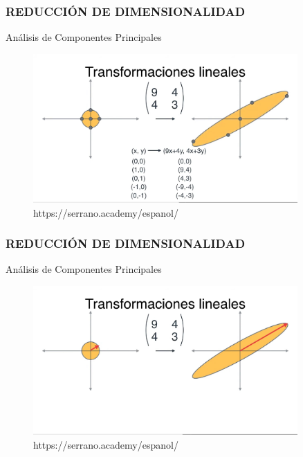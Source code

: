 \documentclass{beamer}
\begin{document}
\begin{frame}
\frametitle{REDUCCIÓN DE DIMENSIONALIDAD}
\begin{block}{Análisis de Componentes Principales}	
	\begin{figure}
		\includegraphics[width=0.9\textwidth]{PCA/IMG_3570.jpg}
		\caption{https://serrano.academy/espanol/}
	\end{figure}
\end{block}
\end{frame}


\begin{frame}
	\frametitle{REDUCCIÓN DE DIMENSIONALIDAD}
	\begin{block}{Análisis de Componentes Principales}	
		\begin{figure}
			\includegraphics[width=0.9\textwidth]{PCA/IMG_3571.jpg}
			\caption{https://serrano.academy/espanol/}
		\end{figure}
	\end{block}
\end{frame}
\end{document}
